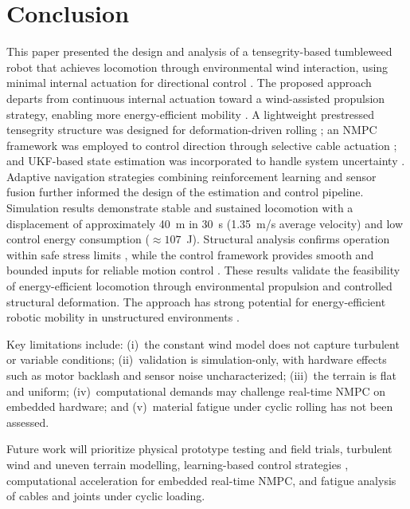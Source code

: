 \documentclass[conference]{IEEEtran}
\begin{document}
\section{Conclusion}
This paper presented the design and analysis of a tensegrity-based tumbleweed
robot that achieves locomotion through environmental wind interaction, using
minimal internal actuation for directional control \cite{b21}. The proposed
approach departs from continuous internal actuation toward a wind-assisted
propulsion strategy, enabling more energy-efficient mobility \cite{b11,b19}.
A lightweight prestressed tensegrity structure was designed for
deformation-driven rolling \cite{b3,b5}; an NMPC framework was employed to
control direction through selective cable actuation \cite{b6,b10}; and
UKF-based state estimation was incorporated to handle system uncertainty
\cite{b7}. Adaptive navigation strategies combining reinforcement learning
and sensor fusion \cite{b20} further informed the design of the estimation
and control pipeline. Simulation results demonstrate stable and sustained
locomotion with a displacement of approximately 40~m in 30~s (1.35~m/s
average velocity) and low control energy consumption ($\approx 107$~J). Structural analysis
confirms operation within safe stress limits \cite{b4,b16}, while the control
framework provides smooth and bounded inputs for reliable motion control
\cite{b8}. These results validate the feasibility of energy-efficient
locomotion through environmental propulsion and controlled structural
deformation. The approach has strong potential for energy-efficient robotic
mobility in unstructured environments \cite{b14,b15}.

Key limitations include: (i)~the constant wind model does not capture
turbulent or variable conditions; (ii)~validation is simulation-only, with
hardware effects such as motor backlash and sensor noise uncharacterized;
(iii)~the terrain is flat and uniform; (iv)~computational demands may
challenge real-time NMPC on embedded hardware; and (v)~material fatigue under
cyclic rolling has not been assessed.

Future work will prioritize physical prototype testing and field trials,
turbulent wind and uneven terrain modelling, learning-based control strategies
\cite{b9,b20}, computational acceleration for embedded real-time NMPC, and
fatigue analysis of cables and joints under cyclic loading.
\end{document}
